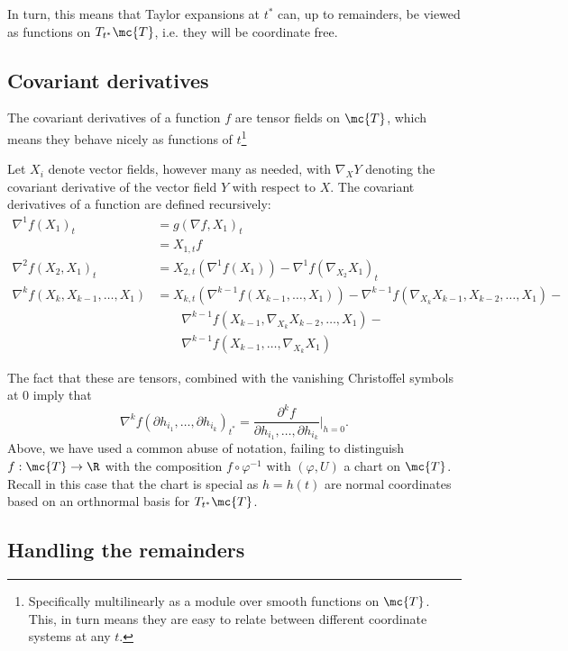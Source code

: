 \documentclass{article}
\begin{document}
In turn, this means that Taylor expansions at $t^*$ can, up to remainders, be viewed as functions on $T_{t^*}\mc{T}$, i.e. they will be coordinate free.

\subsection{Covariant derivatives}

The covariant derivatives of a function $f$ are tensor fields on $\mc{T}$, which means they behave nicely
as functions of $t$\footnote{Specifically multilinearly as a module over smooth functions on $\mc{T}$. This,
in turn means they are easy to relate between different coordinate systems at any $t$.}

Let $X_i$ denote vector fields, however many as needed, with $\nabla_XY$ denoting
the covariant derivative of the vector field $Y$ with respect to $X$. The covariant
derivatives of a function are defined recursively:
$$
\begin{aligned}
  \nabla^1 f(X_1)_t &= g(\nabla f, X_1)_t \\
  &= X_{1,t}f \\
  \nabla^2 f(X_2, X_1)_t &= X_{2,t}(\nabla^1 f(X_1)) - \nabla^1 f(\nabla_{X_2}X_1)_t \\
  \nabla^k f(X_k, X_{k-1}, \dots, X_1) &= X_{k,t}(\nabla^{k-1} f(X_{k-1}, \dots, X_1)) -
  \nabla^{k-1} f(\nabla_{X_k}X_{k-1}, X_{k-2}, \dots, X_1) - \\
&  \qquad   \nabla^{k-1} f(X_{k-1}, \nabla_{X_k}X_{k-2}, \dots, X_1) - \\
  & \qquad \nabla^{k-1} f(X_{k-1}, \dots, \nabla_{X_k}X_1)
  \end{aligned}
$$

The fact that these are tensors, combined with the vanishing Christoffel symbols at 0 imply that
$$
\nabla^k f(\partial h_{i_1}, \dots, \partial h_{i_k})_{t^*} = \frac{\partial^k f}{\partial h_{i_1}, \dots, \partial h_{i_k}} \biggl|_{h=0}.
$$
Above, we have used a common abuse of notation, failing to distinguish $f:\mc{T} \rightarrow \R$ with the
composition $f \circ \varphi^{-1}$ with $(\varphi, U)$ a chart on $\mc{T}$. Recall in this case that the
chart is special as $h=h(t)$ are normal coordinates based on an orthnormal basis for $T_{t^*}\mc{T}$.

\subsection{Handling the remainders}
\end{document}
